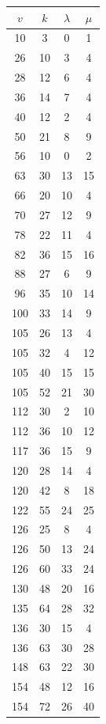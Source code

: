 \documentclass[12pt]{amsproc} %
\theoremstyle{definition}\newtheorem{defn}[thm]{Definition}
\theoremstyle{definition}\newtheorem{rem}[thm]{Remark}
\theoremstyle{definition}\newtheorem{ex}[thm]{Example}
\begin{document}
\begin{table}[ht]
    \centering
    \begin{minipage}{0.25\textwidth}
        \centering
        \begin{tabular}{c|c|c|c}
            $v$ & $k$ & $\lambda$ & $\mu$ \\ 
            \hline
		10 & 3 & 0 & 1 \\ 
		26 & 10 & 3 & 4 \\ 
		28 & 12 & 6 & 4 \\ 
		36 & 14 & 7 & 4 \\ 
		40 & 12 & 2 & 4 \\ 
		50 & 21 & 8 & 9 \\ 
		56 & 10 & 0 & 2 \\ 
		63 & 30 & 13 & 15 \\ 
		66 & 20 & 10 & 4 \\ 
		70 & 27 & 12 & 9 \\ 
		78 & 22 & 11 & 4 \\ 
		82 & 36 & 15 & 16 \\ 
		88 & 27 & 6 & 9 \\ 
		96 & 35 & 10 & 14 \\ 
		100 & 33 & 14 & 9 \\ 
		105 & 26 & 13 & 4 \\ 
		105 & 32 & 4 & 12 \\ 
		105 & 40 & 15 & 15 \\ 
		105 & 52 & 21 & 30 \\ 
		112 & 30 & 2 & 10 \\ 
		112 & 36 & 10 & 12 \\ 
		117 & 36 & 15 & 9 \\ 
		120 & 28 & 14 & 4 \\ 
		120 & 42 & 8 & 18 \\ 
		122 & 55 & 24 & 25 \\ 
		126 & 25 & 8 & 4 \\ 
		126 & 50 & 13 & 24 \\ 
		126 & 60 & 33 & 24 \\ 
		130 & 48 & 20 & 16 \\ 
		135 & 64 & 28 & 32 \\ 
		136 & 30 & 15 & 4 \\ 
		136 & 63 & 30 & 28 \\ 
		148 & 63 & 22 & 30 \\ 
		154 & 48 & 12 & 16 \\ 
		154 & 72 & 26 & 40 \\ 
        \end{tabular}

\end{minipage}
\end{table}
\end{document}
